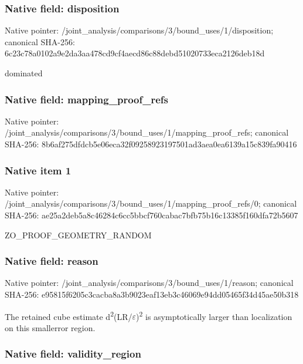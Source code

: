 \documentclass[10pt,a4paper]{article}
\begin{document}
\subsubsection{Native field: disposition}


Native pointer: /joint\_analysis/comparis\allowbreak{}ons/3/bound\_uses/1/dispo\allowbreak{}sition; canonical SHA-256: 6c23c78a0102a9e2da3aa478\allowbreak{}cd9cf4aecd86c88debd51020\allowbreak{}733eca2126deb18d


dominated


\subsubsection{Native field: mapping\_proof\_refs}


Native pointer: /joint\_analysis/comparis\allowbreak{}ons/3/bound\_uses/1/mappi\allowbreak{}ng\_proof\_refs; canonical SHA-256: 8b6af275dfdcb5e06eca32f0\allowbreak{}9258923197501ad3aea0ea61\allowbreak{}39a15c839fa90416



\subsubsection{Native item 1}


Native pointer: /joint\_analysis/comparis\allowbreak{}ons/3/bound\_uses/1/mappi\allowbreak{}ng\_proof\_refs/0; canonical SHA-256: ae25a2deb5a8c46284c6cc5b\allowbreak{}bcf760cabac7bfb75b16c133\allowbreak{}85f160dfa72b5607


ZO\_PROOF\_GEOMETRY\_RANDOM


\subsubsection{Native field: reason}


Native pointer: /joint\_analysis/comparis\allowbreak{}ons/3/bound\_uses/1/reaso\allowbreak{}n; canonical SHA-256: e95815f6205c3cacba8a3b90\allowbreak{}23eaf13eb3c46069e94dd054\allowbreak{}65f34d45ae50b318


The retained cube estimate d\textsuperscript{2}(LR/\ensuremath{\varepsilon})\textsuperscript{2} is asymptotically larger than localization on this smallerror region.


\subsubsection{Native field: validity\_region}
\end{document}
